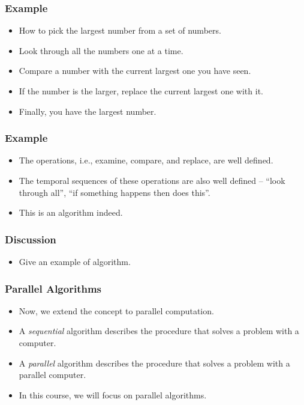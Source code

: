 \documentclass{beamer}
\begin{document}
\begin{CJK}{UTF8}{bsmi}
\begin{frame}
\frametitle{Example}
\begin{itemize}
\item How to pick the largest number from a set of numbers.
\item Look through all the numbers one at a time.
\item Compare a number with the current largest one you have seen.
\item If the number is the larger, replace the current largest one with it.
\item Finally, you have the largest number.
\end{itemize}
\end{frame}

\begin{frame}
\frametitle{Example}
\begin{itemize}
\item The operations, i.e., examine, compare, and replace, are well
  defined.
\item The temporal sequences of these operations are also well defined
  -- ``look through all'', ``if something happens then does this''.
\item This is an algorithm indeed.
\end{itemize}
\end{frame}

\begin{frame}
\frametitle{Discussion}
\begin{itemize}
\item Give an example of algorithm.
\end{itemize}
\end{frame}

\begin{frame}
\frametitle{Parallel Algorithms}
\begin{itemize}
\item Now, we extend the concept to parallel computation.
\item A {\em sequential} algorithm describes the procedure that solves a problem with a computer.
\item A {\em parallel} algorithm describes the procedure that solves a problem with a parallel computer.
\item In this course, we will focus on parallel algorithms.
\end{itemize}
\end{frame}


\end{CJK}
\end{document}
